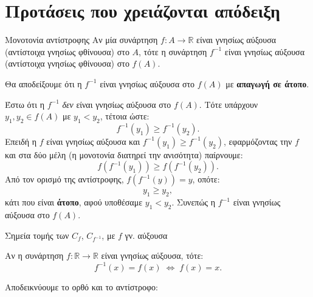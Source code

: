\section{Προτάσεις που χρειάζονται απόδειξη}
\begin{Protashmabox}{Μονοτονία αντίστροφης}
Αν μία συνάρτηση $f : A \to \mathbb{R}$ είναι γνησίως αύξουσα (αντίστοιχα γνησίως φθίνουσα)
στο $A$, τότε η συνάρτηση $f^{-1}$ είναι γνησίως αύξουσα (αντίστοιχα γνησίως φθίνουσα)
στο $f(A)$.
\end{Protashmabox}
\apodeixi

Θα αποδείξουμε ότι η $f^{-1}$ είναι γνησίως αύξουσα στο $f(A)$ με \textbf{απαγωγή σε άτοπο}.

Έστω ότι η $f^{-1}$ \emph{δεν} είναι γνησίως αύξουσα στο $f(A)$. Τότε υπάρχουν
$y_1, y_2 \in f(A)$ με $y_1 < y_2$, τέτοια ώστε:
\[
  f^{-1}(y_1) \geq f^{-1}(y_2).
\]
Επειδή η $f$ είναι γνησίως αύξουσα και $f^{-1}(y_1) \geq f^{-1}(y_2)$,
εφαρμόζοντας την $f$ και στα δύο μέλη (η μονοτονία διατηρεί την ανισότητα) παίρνουμε:
\[
  f\!\left(f^{-1}(y_1)\right) \geq f\!\left(f^{-1}(y_2)\right).
\]
Από τον ορισμό της αντίστροφης, $f\!\left(f^{-1}(y)\right) = y$, οπότε:
\[
  y_1 \geq y_2,
\]
κάτι που είναι \textbf{άτοπο}, αφού υποθέσαμε $y_1 < y_2$. Συνεπώς η $f^{-1}$ είναι γνησίως αύξουσα στο $f(A)$.


\begin{Protashmabox}{Σημεία τομής των $C_f$, $C_{f^{-1}}$, με $f$ γν. αύξουσα}

Αν η συνάρτηση $f : \mathbb{R} \to \mathbb{R}$ είναι γνησίως αύξουσα, τότε:
\[
  f^{-1}(x) = f(x) \;\Leftrightarrow\; f(x) = x.
\]
\end{Protashmabox}

\apodeixi

Αποδεικνύουμε το ορθό και το αντίστροφο:

